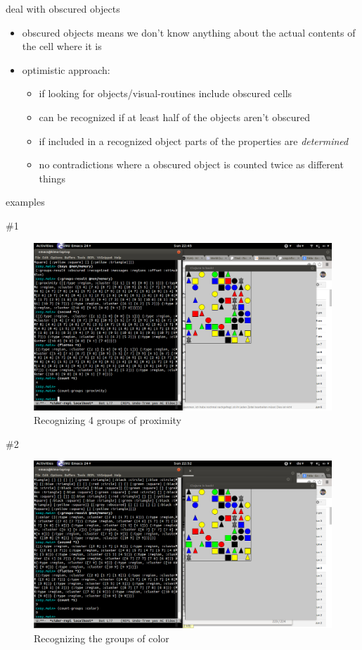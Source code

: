 \documentclass[presentation]{beamer}
\begin{document}
\begin{frame}[label=sec-4]{deal with obscured objects}
\begin{itemize}
\item obscured objects means we don't know anything about the 
\alert{actual} contents of the cell where it is
\item optimistic approach:
\begin{itemize}
\item if looking for objects/visual-routines include obscured cells
\item can be recognized if at least half of the objects aren't obscured
\item if included in a recognized object parts of the properties
are \emph{determined}
\item no contradictions where a obscured object is counted twice 
as different things
\end{itemize}
\end{itemize}
\end{frame}
\begin{frame}[label=sec-5]{examples}
\end{frame}
\begin{frame}[label=sec-6]{\#1}
\begin{figure}[hbtp]
     \centering
     \includegraphics[width=\textwidth]{grouping_example}
     \caption{Recognizing 4 groups of proximity}
     \label{fig:aufbau}
 \end{figure}
\end{frame}
\begin{frame}[label=sec-7]{\#2}
\begin{figure}[hbtp]
     \centering
     \includegraphics[width=\textwidth]{color_groups_example}
     \caption{Recognizing the groups of color}
     \label{fig:aufbau}
 \end{figure}
\end{frame}
\end{document}
